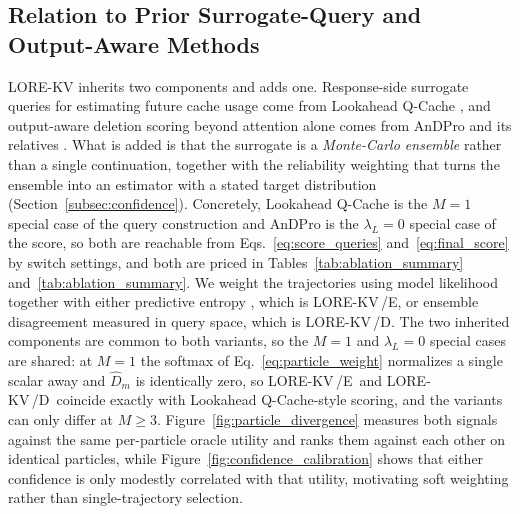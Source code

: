 \documentclass{article} %
\newcommand{\lorekvE}{LORE-KV\,/E}
\newcommand{\lorekvD}{LORE-KV\,/D}
\begin{document}
\subsection{Relation to Prior Surrogate-Query and Output-Aware Methods} \label{app:lookahead_details}
LORE-KV inherits two components and adds one. Response-side surrogate queries for estimating future cache usage come from Lookahead Q-Cache \citep{wang2025lookahead,ahn2026lookaheadkv}, and output-aware deletion scoring beyond attention alone comes from AnDPro and its relatives \citep{guo2024criticalkv,geng2026accurate,mai2026laprox}. What is added is that the surrogate is a \emph{Monte-Carlo ensemble} rather than a single continuation, together with the reliability weighting that turns the ensemble into an estimator with a stated target distribution (Section~\ref{subsec:confidence}). Concretely, Lookahead Q-Cache is the $M{=}1$ special case of the query construction and AnDPro is the $\lambda_L{=}0$ special case of the score, so both are reachable from Eqs.~\eqref{eq:score_queries} and~\eqref{eq:final_score} by switch settings, and both are priced in Tables~\ref{tab:ablation_summary} and~\ref{tab:ablation_summary}. We weight the trajectories using model likelihood together with either predictive entropy \citep{kuhn2023semantic,farquhar2024detecting}, which is \lorekvE, or ensemble disagreement measured in query space, which is \lorekvD. The two inherited components are common to both variants, so the $M{=}1$ and $\lambda_L{=}0$ special cases are shared: at $M{=}1$ the softmax of Eq.~\eqref{eq:particle_weight} normalizes a single scalar away and $\hat D_m$ is identically zero, so \lorekvE\ and \lorekvD\ coincide exactly with Lookahead Q-Cache-style scoring, and the variants can only differ at $M\ge3$. Figure~\ref{fig:particle_divergence} measures both signals against the same per-particle oracle utility and ranks them against each other on identical particles, while Figure~\ref{fig:confidence_calibration} shows that either confidence is only modestly correlated with that utility, motivating soft weighting rather than single-trajectory selection.
\end{document}
